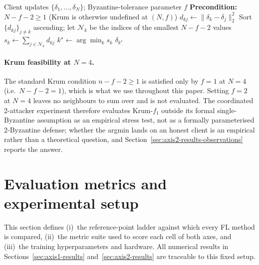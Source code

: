 \documentclass[preprint,12pt,authoryear]{elsarticle}
\begin{document}
\begin{algorithm}[!ht]
\caption{Krum aggregation with Byzantine tolerance $f$.}
\label{alg:krum}
\begin{algorithmic}[1]
\Require Client updates $\{\delta_1, \ldots, \delta_N\}$; Byzantine-tolerance parameter $f$
\Statex \textbf{Precondition:} $N - f - 2 \geq 1$ (Krum is otherwise undefined at $(N, f)$)
        \State $d_{kj} \gets \| \delta_k - \delta_j \|_2^2$
    \EndFor
    \State Sort $\{d_{kj}\}_{j \neq k}$ ascending; let $\mathcal{N}_k$ be the indices of the smallest $N - f - 2$ values
    \State $s_k \gets \sum_{j \in \mathcal{N}_k} d_{kj}$ 
\EndFor
\State $k^\star \gets \arg\min_k s_k$
\State \Return $\delta_{k^\star}$ 
\end{algorithmic}
\end{algorithm}

\paragraph{Krum feasibility at $N = 4$.}
The standard Krum condition $n - f - 2 \geq 1$ is satisfied only
by $f = 1$ at $N = 4$ (i.e.\ $N - f - 2 = 1$), which is what we
use throughout this paper. Setting $f = 2$ at $N = 4$ leaves no
neighbours to sum over and is not evaluated. The coordinated
2-attacker experiment therefore evaluates Krum-$f_1$ outside its
formal single-Byzantine assumption as an empirical stress test,
not as a formally parameterised 2-Byzantine defense; whether the
argmin lands on an honest client is an empirical rather than a
theoretical question, and
Section~\ref{sec:axis2-results-observations} reports the answer.


\section{Evaluation metrics and experimental setup}
\label{sec:setup}

This section defines (i)~the reference-point ladder against which
every FL method is compared, (ii)~the metric suite used to score
each cell of both axes, and (iii)~the training hyperparameters and
hardware. All numerical results in Sections~\ref{sec:axis1-results}
and~\ref{sec:axis2-results} are traceable to this fixed setup.
\end{document}
